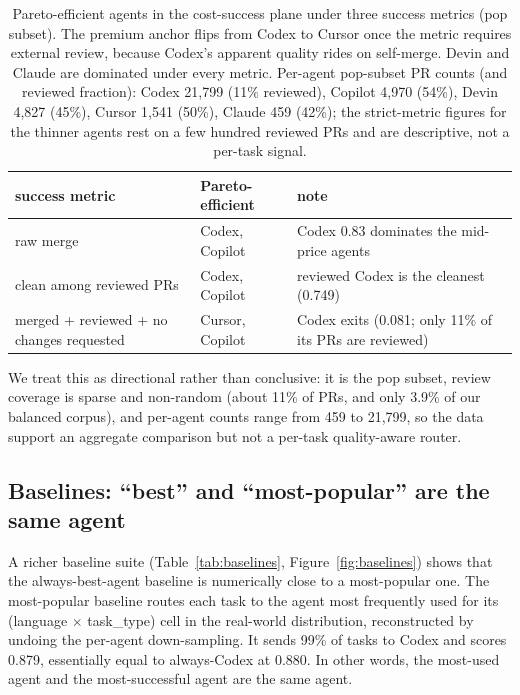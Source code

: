 \documentclass[sigconf,nonacm]{acmart}
\begin{document}
\begin{table}[h]
  \centering
  \caption{Pareto-efficient agents in the cost-success plane under three success metrics (pop subset). The premium anchor flips from Codex to Cursor once the metric requires external review, because Codex's apparent quality rides on self-merge. Devin and Claude are dominated under every metric. Per-agent pop-subset PR counts (and reviewed fraction): Codex 21,799 (11\% reviewed), Copilot 4,970 (54\%), Devin 4,827 (45\%), Cursor 1,541 (50\%), Claude 459 (42\%); the strict-metric figures for the thinner agents rest on a few hundred reviewed PRs and are descriptive, not a per-task signal.}
  \label{tab:metricflip}
  \begin{tabular}{p{}p{}p{}}
    \toprule
    success metric & Pareto-efficient & note \\
    \midrule
    raw merge & Codex, Copilot & Codex 0.83 dominates the mid-price agents \\
    clean among reviewed PRs & Codex, Copilot & reviewed Codex is the cleanest (0.749) \\
    merged + reviewed + no changes requested & Cursor, Copilot & Codex exits (0.081; only 11\% of its PRs are reviewed) \\
    \bottomrule
  \end{tabular}
\end{table}

We treat this as directional rather than conclusive: it is the pop subset, review coverage is sparse and non-random (about 11\% of PRs, and only 3.9\% of our balanced corpus), and per-agent counts range from 459 to 21,799, so the data support an aggregate comparison but not a per-task quality-aware router.

\subsection{Baselines: ``best'' and ``most-popular'' are the same agent}\label{sec:baselines}

A richer baseline suite (Table~\ref{tab:baselines}, Figure~\ref{fig:baselines}) shows that the always-best-agent baseline is numerically close to a most-popular one. The most-popular baseline routes each task to the agent most frequently used for its (language $\times$ task\_type) cell in the real-world distribution, reconstructed by undoing the per-agent down-sampling. It sends 99\% of tasks to Codex and scores 0.879, essentially equal to always-Codex at 0.880. In other words, the most-used agent and the most-successful agent are the same agent.
\end{document}
